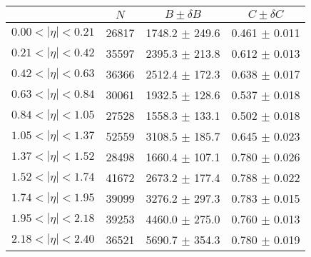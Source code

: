 \begin{tabular}{lccc}
\hline
    &   $N$   & $B \pm \delta B$  &  $C \pm \delta C$ \\
\hline
$0.00 < |\eta| <0.21$          & 26817      & 1748.2     $\pm$ 249.6 & 0.461      $\pm$ 0.011 \\
$0.21 < |\eta| <0.42$          & 35597      & 2395.3     $\pm$ 213.8 & 0.612      $\pm$ 0.013 \\
$0.42 < |\eta| <0.63$          & 36366      & 2512.4     $\pm$ 172.3 & 0.638      $\pm$ 0.017 \\
$0.63 < |\eta| <0.84$          & 30061      & 1932.5     $\pm$ 128.6 & 0.537      $\pm$ 0.018 \\
$0.84 < |\eta| <1.05$          & 27528      & 1558.3     $\pm$ 133.1 & 0.502      $\pm$ 0.018 \\
$1.05 < |\eta| <1.37$          & 52559      & 3108.5     $\pm$ 185.7 & 0.645      $\pm$ 0.023 \\
$1.37 < |\eta| <1.52$          & 28498      & 1660.4     $\pm$ 107.1 & 0.780      $\pm$ 0.026 \\
$1.52 < |\eta| <1.74$          & 41672      & 2673.2     $\pm$ 177.4 & 0.788      $\pm$ 0.022 \\
$1.74 < |\eta| <1.95$          & 39099      & 3276.2     $\pm$ 297.3 & 0.783      $\pm$ 0.015 \\
$1.95 < |\eta| <2.18$          & 39253      & 4460.0     $\pm$ 275.0 & 0.760      $\pm$ 0.013 \\
$2.18 < |\eta| <2.40$          & 36521      & 5690.7     $\pm$ 354.3 & 0.780      $\pm$ 0.019 \\
\hline
\end{tabular}
